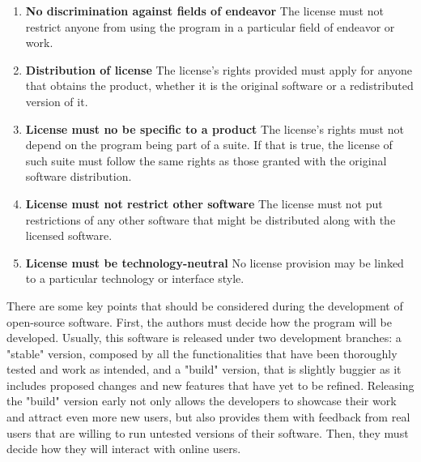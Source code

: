 \begin{enumerate}
    \item \textbf{No discrimination against fields of endeavor} \newline
    The license must not restrict anyone from using the program in a particular field of endeavor or work.
    
    \item \textbf{Distribution of license} \newline
    The license's rights provided must apply for anyone that obtains the product, whether it is the original software or a redistributed version of it.
    
    \item \textbf{License must no be specific to a product} \newline
    The license's rights must not depend on the program being part of a suite. If that is true, the license of such suite must follow the same rights as those granted with the original software distribution. 
    
    \item \textbf{License must not restrict other software} \newline
    The license must not put restrictions of any other software that might be distributed along with the licensed software.
    
    \item \textbf{License must be technology-neutral} \newline
    No license provision may be linked to a particular technology or interface style.
\end{enumerate}
There are some key points that should be considered during the development of open-source software.
\newline \newline
First, the authors must decide how the program will be developed.
\newline
Usually, this software is released under two development branches: a "stable" version, composed by all the functionalities that have been thoroughly tested and work as intended, and a "build" version, that is slightly buggier as it includes proposed changes and new features that have yet to be refined.
Releasing the "build" version early not only allows the developers to showcase their work and attract even more new users, but also provides them with feedback from real users that are willing to run untested versions of their software.
\newline \newline
Then, they must decide how they will interact with online users.
